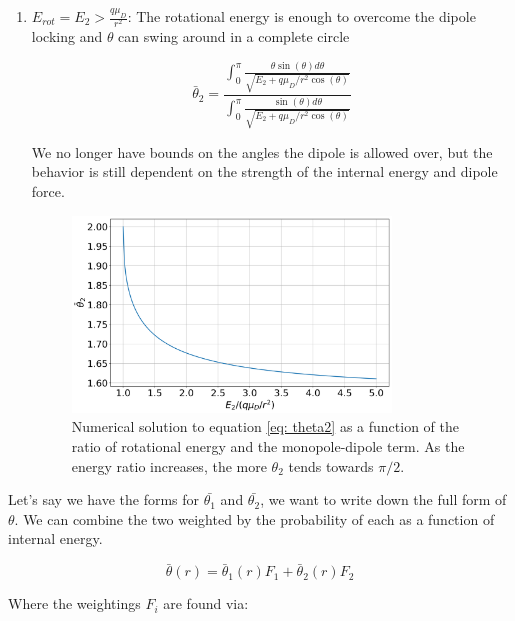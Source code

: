 \begin{enumerate}
	\item $E_{rot} = E_2 > \frac{q \mu_D}{r^2}$:
	The rotational energy is enough to overcome the dipole locking and $\theta$ can swing around in a complete circle

	\begin{equation}
	    \bar{\theta}_2  = \dfrac{\displaystyle\int_0^\pi \frac{\theta \sin(\theta) d\theta}{\sqrt{E_2 + q \mu_D/r^2 \cos(\theta)}}}{\displaystyle\int_0^\pi \frac{\sin(\theta) d \theta}{\sqrt{E_2 + q \mu_D/r^2 \cos(\theta)}}} \label{eq: theta2}
	\end{equation}

	We no longer have bounds on the angles the dipole is allowed over, but the behavior is still dependent on the strength of the internal energy and dipole force.

	\begin{figure}[H]
		\label{fig: theta2}
		\centering
		\includegraphics[width=0.8\textwidth]{images/ADO_theta2.png}
		\caption{Numerical solution to equation \ref{eq: theta2} as a function of the ratio of rotational energy and the monopole-dipole term. As the energy ratio increases, the more $\theta_2$ tends towards $\pi/2$.}
	\end{figure}

\end{enumerate}

Let's say we have the forms for $\bar{\theta_1}$ and $\bar{\theta_2}$, we want to write down the full form of $\theta$. We can combine the two weighted by the probability of each as a function of internal energy.

\begin{equation}
    \bar{\theta}(r) = \bar{\theta}_1(r) F_1 + \bar{\theta}_2(r) F_2 \label{eq: weighted theta}
\end{equation}

Where the weightings $F_i$ are found via:

